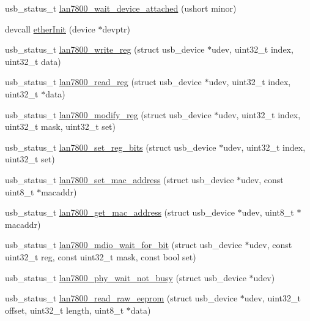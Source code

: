 \begin{DoxyCompactItemize}
\item 
usb\-\_\-status\-\_\-t \hyperlink{group__lan7800_ga332faebc17d841f5faeae06562624624}{lan7800\-\_\-wait\-\_\-device\-\_\-attached} (ushort minor)
\item 
devcall \hyperlink{group__lan7800_gabebfba028b4cb811de75d2beabfd1669}{ether\-Init} (device $\ast$devptr)
\item 
usb\-\_\-status\-\_\-t \hyperlink{group__lan7800_gac5a2ec33aa01163f97cfe029dab945d9}{lan7800\-\_\-write\-\_\-reg} (struct usb\-\_\-device $\ast$udev, uint32\-\_\-t index, uint32\-\_\-t data)
\item 
usb\-\_\-status\-\_\-t \hyperlink{group__lan7800_gaa07a9c41cdf666a27e67905ed9121e23}{lan7800\-\_\-read\-\_\-reg} (struct usb\-\_\-device $\ast$udev, uint32\-\_\-t index, uint32\-\_\-t $\ast$data)
\item 
usb\-\_\-status\-\_\-t \hyperlink{group__lan7800_ga2283a3790e3b0874e957b9c10ef44998}{lan7800\-\_\-modify\-\_\-reg} (struct usb\-\_\-device $\ast$udev, uint32\-\_\-t index, uint32\-\_\-t mask, uint32\-\_\-t set)
\item 
usb\-\_\-status\-\_\-t \hyperlink{group__lan7800_ga164a8202ae5fb3af0f6de37a166e83b9}{lan7800\-\_\-set\-\_\-reg\-\_\-bits} (struct usb\-\_\-device $\ast$udev, uint32\-\_\-t index, uint32\-\_\-t set)
\item 
usb\-\_\-status\-\_\-t \hyperlink{group__lan7800_ga6bfd9afefc7838b5a054d0bc3a03e1b4}{lan7800\-\_\-set\-\_\-mac\-\_\-address} (struct usb\-\_\-device $\ast$udev, const uint8\-\_\-t $\ast$macaddr)
\item 
usb\-\_\-status\-\_\-t \hyperlink{group__lan7800_ga835efd429fb96b942474c163a03f1b82}{lan7800\-\_\-get\-\_\-mac\-\_\-address} (struct usb\-\_\-device $\ast$udev, uint8\-\_\-t $\ast$macaddr)
\item 
usb\-\_\-status\-\_\-t \hyperlink{group__lan7800_gaf2e2dfd8f8f1403f261de53e0c4a072a}{lan7800\-\_\-mdio\-\_\-wait\-\_\-for\-\_\-bit} (struct usb\-\_\-device $\ast$udev, const uint32\-\_\-t reg, const uint32\-\_\-t mask, const bool set)
\item 
usb\-\_\-status\-\_\-t \hyperlink{group__lan7800_gadfe8a9f28bc2ce5929b585baed8fc407}{lan7800\-\_\-phy\-\_\-wait\-\_\-not\-\_\-busy} (struct usb\-\_\-device $\ast$udev)
\item 
usb\-\_\-status\-\_\-t \hyperlink{group__lan7800_ga03a05fda47e55dbcddeabc9980d1b671}{lan7800\-\_\-read\-\_\-raw\-\_\-eeprom} (struct usb\-\_\-device $\ast$udev, uint32\-\_\-t offset, uint32\-\_\-t length, uint8\-\_\-t $\ast$data)

\end{DoxyCompactItemize}
